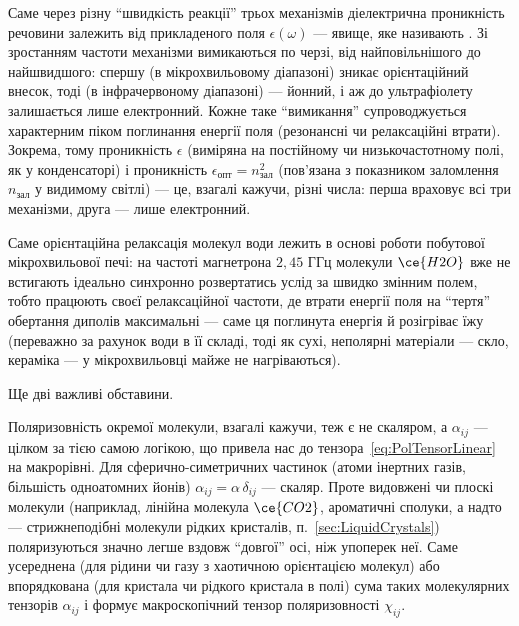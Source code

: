 \begin{Attention}
	Саме через різну \enquote{швидкість реакції} трьох механізмів діелектрична проникність речовини залежить від  прикладеного поля
	$\epsilon(\omega)$ --- явище, яке називають . Зі зростанням частоти механізми вимикаються по черзі,
	від найповільнішого до найшвидшого: спершу (в мікрохвильовому діапазоні) зникає орієнтаційний внесок, тоді (в інфрачервоному діапазоні) --- йонний,
	і аж до ультрафіолету залишається лише електронний. Кожне таке \enquote{вимикання} супроводжується характерним піком поглинання енергії поля
	(резонансні чи релаксаційні втрати). Зокрема, тому  проникність $\epsilon$ (виміряна на постійному чи низькочастотному полі, як у
	конденсаторі) і  проникність $\epsilon_\text{опт} = n_\text{зал}^2$ (пов'язана з показником заломлення $n_\text{зал}$ у видимому
	світлі) --- це, взагалі кажучи, різні числа: перша враховує всі три механізми, друга --- лише електронний.

	 Саме орієнтаційна релаксація молекул води лежить в основі роботи побутової мікрохвильової печі: на частоті
	магнетрона $2{,}45$ ГГц молекули $\ce{H2O}$ вже не встигають ідеально синхронно розвертатись услід за швидко змінним полем, тобто працюють
	 своєї релаксаційної частоти, де втрати енергії поля на \enquote{тертя} обертання диполів максимальні --- саме ця поглинута
	енергія й розігріває їжу (переважно за рахунок води в її складі, тоді як сухі, неполярні матеріали --- скло, кераміка --- у мікрохвильовці майже
	не нагріваються).
\end{Attention}

Ще дві важливі обставини.

 Поляризовність окремої молекули, взагалі кажучи, теж є не скаляром, а  $\alpha_{ij}$ --- цілком за тією самою
логікою, що привела нас до тензора~\eqref{eq:PolTensorLinear} на макрорівні. Для сферично-симетричних частинок (атоми інертних газів, більшість
одноатомних йонів) $\alpha_{ij}=\alpha\,\delta_{ij}$ --- скаляр. Проте видовжені чи плоскі молекули (наприклад, лінійна молекула $\ce{CO2}$,
ароматичні сполуки, а надто --- стрижнеподібні молекули рідких кристалів, п.~\ref{sec:LiquidCrystals}) поляризуються значно легше вздовж \enquote{довгої}
осі, ніж упоперек неї. Саме усереднена (для рідини чи газу з хаотичною орієнтацією молекул) або впорядкована (для кристала чи рідкого кристала в
полі) сума таких молекулярних тензорів $\alpha_{ij}$ і формує макроскопічний тензор поляризовності $\chi_{ij}$.

